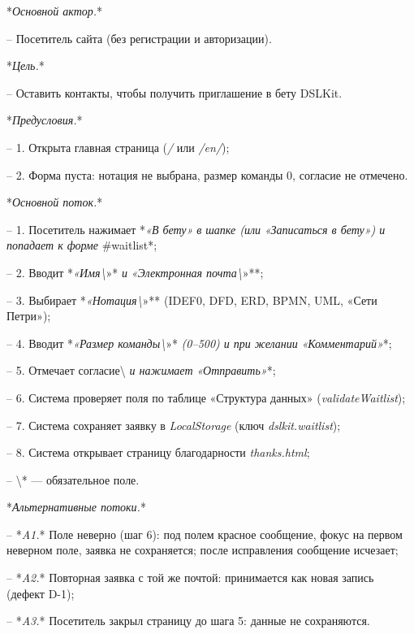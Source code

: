 \documentclass[a4paper,14pt]{extarticle}
\begin{document}
*\textit{Основной актор.}*


– Посетитель сайта (без регистрации и авторизации).



*\textit{Цель.}*


– Оставить контакты, чтобы получить приглашение в бету DSLKit.



*\textit{Предусловия.}*


– 1. Открыта главная страница (\textit{/} или \textit{/en/});

– 2. Форма пуста: нотация не выбрана, размер команды 0, согласие не отмечено.



*\textit{Основной поток.}*


– 1. Посетитель нажимает *\textit{«В бету»}\textit{ в шапке (или }\textit{«Записаться в бету»}\textit{) и попадает к форме }\#waitlist*;

– 2. Вводит *\textit{«Имя\textbackslash{}}»*\textit{ и }\textit{«Электронная почта\textbackslash{}}»**;

– 3. Выбирает *\textit{«Нотация\textbackslash{}}»** (IDEF0, DFD, ERD, BPMN, UML, «Сети Петри»);

– 4. Вводит *\textit{«Размер команды\textbackslash{}}»*\textit{ (0–500) и при желании }\textit{«Комментарий»}*;

– 5. Отмечает согласие\textbackslash{}\textit{ и нажимает }\textit{«Отправить»}*;

– 6. Система проверяет поля по таблице «Структура данных» (\textit{validateWaitlist});

– 7. Система сохраняет заявку в \textit{LocalStorage} (ключ \textit{dslkit.waitlist});

– 8. Система открывает страницу благодарности \textit{thanks.html};

– \textbackslash{}* — обязательное поле.



*\textit{Альтернативные потоки.}*


– *\textit{A1.}* Поле неверно (шаг 6): под полем красное сообщение, фокус на первом неверном поле, заявка не сохраняется; после исправления сообщение исчезает;

– *\textit{A2.}* Повторная заявка с той же почтой: принимается как новая запись (дефект D-1);

– *\textit{A3.}* Посетитель закрыл страницу до шага 5: данные не сохраняются.
\end{document}
